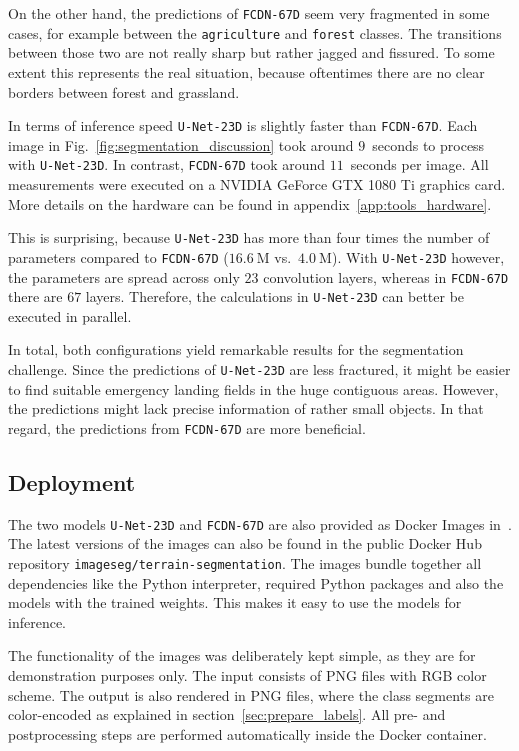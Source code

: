 On the other hand, the predictions of \texttt{FCDN-67D} seem very fragmented in some cases, for example between the \texttt{agriculture} and \texttt{forest} classes. The transitions between those two are not really sharp but rather jagged and fissured. To some extent this represents the real situation, because oftentimes there are no clear borders between forest and grassland.

In terms of inference speed \texttt{U-Net-23D} is slightly faster than \texttt{FCDN-67D}. Each image in Fig.~\ref{fig:segmentation_discussion} took around $9$~seconds to process with \texttt{U-Net-23D}. In contrast, \texttt{FCDN-67D} took around $11$~seconds per image. All measurements were executed on a NVIDIA GeForce GTX 1080 Ti graphics card. More details on the hardware can be found in appendix~\ref{app:tools_hardware}.

This is surprising, because \texttt{U-Net-23D} has more than four times the number of parameters compared to \texttt{FCDN-67D} ($16.6~\text{M}$ vs.\ $4.0~\text{M}$). With \texttt{U-Net-23D} however, the parameters are spread across only $23$ convolution layers, whereas in \texttt{FCDN-67D} there are $67$ layers. Therefore, the calculations in \texttt{U-Net-23D} can better be executed in parallel.

In total, both configurations yield remarkable results for the segmentation challenge. Since the predictions of \texttt{U-Net-23D} are less fractured, it might be easier to find suitable emergency landing fields in the huge contiguous areas. However, the predictions might lack precise information of rather small objects. In that regard, the predictions from \texttt{FCDN-67D} are more beneficial.

\subsection{Deployment}
The two models \texttt{U-Net-23D} and \texttt{FCDN-67D} are also provided as Docker Images in~\cite{thesis-code20}. The latest versions of the images can also be found in the public Docker Hub repository \texttt{imageseg/terrain-segmentation}. The images bundle together all dependencies like the Python interpreter, required Python packages and also the models with the trained weights. This makes it easy to use the models for inference.

The functionality of the images was deliberately kept simple, as they are for demonstration purposes only. The input consists of PNG files with RGB color scheme. The output is also rendered in PNG files, where the class segments are color-encoded as explained in section~\ref{sec:prepare_labels}. All pre- and postprocessing steps are performed automatically inside the Docker container.

